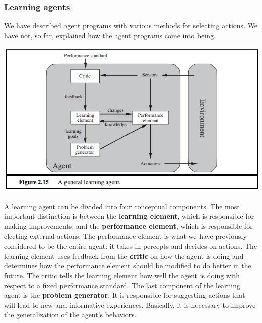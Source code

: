 \subsubsection{Learning agents}
We have described agent programs with various methods for selecting actions. We have not, so far, explained how the agent programs come into being.
\begin{center}
    \includegraphics[]{images/Learning agent.png}
\end{center}
A learning agent can be divided into four conceptual components. The most important distinction is between the \textbf{learning element}, which is responsible for making improvements, and the \textbf{performance element}, which is responsible for electing external actions. The performance element is what we have previously considered to be the entire agent: it takes in percepts and decides on actions. The learning element uses
feedback from the \textbf{critic} on how the agent is doing and determines how the performance element should be modified to do better in the future. The critic tells the learning element how well the agent is doing with respect to a fixed performance standard. The last component of the learning agent is the \textbf{problem generator}. It is responsible for suggesting actions that will lead to new and informative experiences. Basically, it is necessary to improve the generalization of the agent's behaviors.

